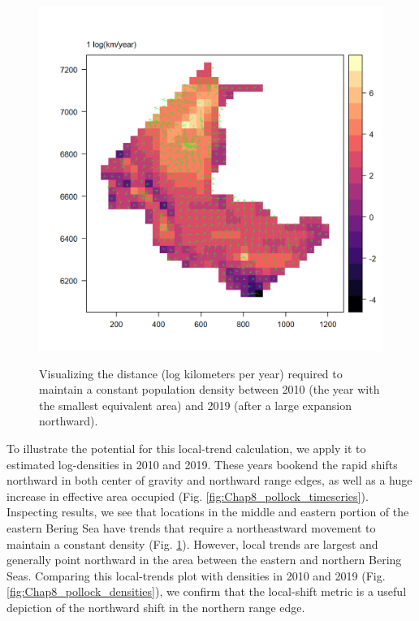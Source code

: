 \begin{figure}[!ht]
    \caption[Measurements of local trends for pollock from 2010 to 2019]{Visualizing the distance (log kilometers per year) required to maintain a constant population density between 2010 (the year with the smallest equivalent area) and 2019 (after a large expansion northward).}
    \centering
    \includegraphics[width=5.5in]{Chap_8/local_trends.png}
    \label{fig:Chap8_local_trends}
\end{figure}

To illustrate the potential for this local-trend calculation, we apply it to estimated log-densities in 2010 and 2019.  These years bookend the rapid shifts northward in both center of gravity and northward range edges, as well as a huge increase in effective area occupied (Fig. \ref{fig:Chap8_pollock_timeseries}).  Inspecting results, we see that locations in the middle and eastern portion of the eastern Bering Sea have trends that require a northeastward movement to maintain a constant density (Fig. \ref{fig:Chap8_local_trends}).  However, local trends are largest and generally point northward in the area between the eastern and northern Bering Seas.  Comparing this local-trends plot with densities in 2010 and 2019 (Fig. \ref{fig:Chap8_pollock_densities}), we confirm that the local-shift metric is a useful depiction of the northward shift in the northern range edge.  

